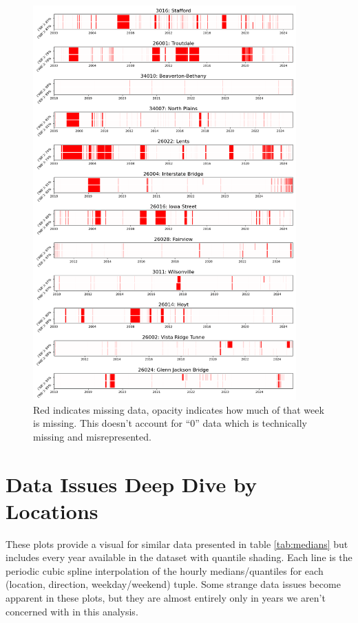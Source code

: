 \documentclass{article}
\begin{document}
\begin{figure}[H] 
    \centering
    \includegraphics[width=0.9\textwidth]{missing_data.png}
    \caption{Red indicates missing data, opacity indicates how much of that week is missing. This doesn't account for ``0'' data which is technically missing and misrepresented.}
    \label{fig:data_availability}
\end{figure}

\section{Data Issues Deep Dive by Locations} \label{app:data_issues}

These plots provide a visual for similar data presented in table \ref{tab:medians} but includes every year available in the dataset with quantile shading. Each line is the periodic cubic spline interpolation of the hourly medians/quantiles for each (location, direction, weekday/weekend) tuple. Some strange data issues become apparent in these plots, but they are almost entirely only in years we aren't concerned with in this analysis.


%
\end{document}
